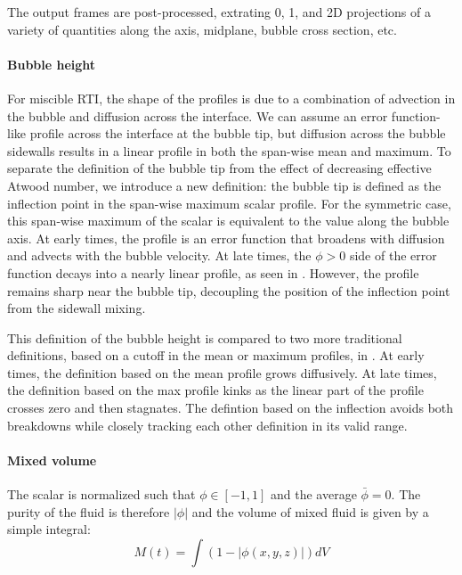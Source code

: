 The output frames are post-processed, extrating 0, 1, and 2D projections of a variety of quantities along the axis, midplane, bubble cross section, etc.


\paragraph{Bubble height}
For miscible RTI, the shape of the profiles is due to a combination of advection in the bubble and diffusion across the interface.
We can assume an error function-like profile across the interface at the bubble tip, but diffusion across the bubble sidewalls results in a linear profile in both the span-wise mean and maximum.
To separate the definition of the bubble tip from the effect of decreasing effective Atwood number, we introduce a new definition: the bubble tip is defined as the inflection point in the span-wise maximum scalar profile.
For the symmetric case, this span-wise maximum of the scalar is equivalent to the value along the bubble axis.
At early times, the profile is an error function that broadens with diffusion and advects with the bubble velocity.
At late times, the $\phi > 0$ side of the error function decays into a nearly linear profile, as seen in .
However, the profile remains sharp near the bubble tip, decoupling the position of the inflection point from the sidewall mixing.

This definition of the bubble height is compared to two more traditional definitions, based on a cutoff in the mean or maximum profiles, in .
At early times, the definition based on the mean profile grows diffusively.
At late times, the definition based on the max profile kinks as the linear part of the profile crosses zero and then stagnates.
The defintion based on the inflection avoids both breakdowns while closely tracking each other definition in its valid range.

\paragraph{Mixed volume}

The scalar is normalized such that $\phi \in \left[-1, 1\right]$ and the average $\bar\phi = 0$.
The purity of the fluid is therefore $\left| \phi \right|$ and the volume of mixed fluid is given by a simple integral:
\begin{equation}
M(t) = \int \left( 1 - \left| \phi(x,y,z) \right|\right) dV
\end{equation}

